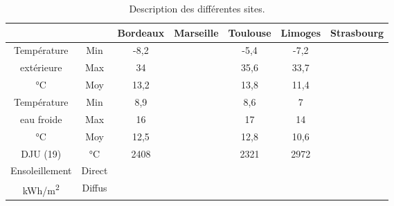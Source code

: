 \begin{table}
    \begin{tabular}{c c | c c c c c}
                            &                     & \textbf{Bordeaux}         & \textbf{Marseille} & \textbf{Toulouse}       & \textbf{Limoges}            & \textbf{Strasbourg}         \\
        \toprule
        Température         & Min                 & \cellcolor{Amaranth}-8,2  &                    & -5,4                    & -7,2                        &  \\
        extérieure          & Max                 & 34                        &                    & 35,6                    & 33,7                        &  \\
        \si{\degreeCelsius} & Moy                 & 13,2                      &                    & 13,8                    & 11,4                        &  \\
        \midrule
        Température         & Min                 & 8,9                       &                    & 8,6                     & \cellcolor{Amaranth}7       &  \\
        eau froide          & Max                 & 16                        &                    & 17                      & 14                          &  \\
        \si{\degreeCelsius} & Moy                 & 12,5                      &                    & 12,8                    & \cellcolor{Amaranth}10,6    &  \\
        \midrule
        DJU (19)            & \si{\degreeCelsius} & 2408                      &                    & 2321                    & \cellcolor{Amaranth}2972    &  \\
        \midrule
        Ensoleillement      &  Direct             &                           &                    &                         &                             &  \\
        \si{kWh/m^{2}}      &  Diffus             &                           &                    &                         &                             &  \\
        \bottomrule
    \end{tabular}
    \caption{Description des différentes sites.}
    \label{tab:description_site}
\end{table}
\normalsize

